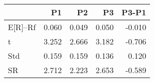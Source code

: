 \begin{tabular}{lrrrr}
\toprule
 & P1 & P2 & P3 & P3-P1 \\
\midrule
E[R]--Rf & 0.060 & 0.049 & 0.050 & -0.010 \\
t & 3.252 & 2.666 & 3.182 & -0.706 \\
Std & 0.159 & 0.159 & 0.136 & 0.120 \\
SR & 2.712 & 2.223 & 2.653 & -0.589 \\
\bottomrule
\end{tabular}
